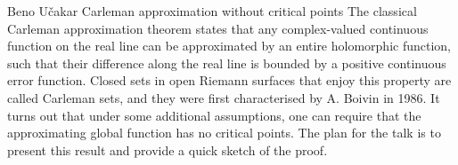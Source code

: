 \talk
{%
    Beno Učakar
}
{%
    Carleman approximation without critical points
}
{%
    The classical Carleman approximation theorem states that any
    complex-valued continuous function on the real line can be
    approximated by an entire holomorphic function, such that their
    difference along the real line is bounded by a positive
    continuous error function. Closed sets in open Riemann surfaces
    that enjoy this property are called Carleman sets, and they were
    first characterised by A. Boivin in 1986. It turns out that
    under some additional assumptions, one can require that the
    approximating global function has no critical points. The plan
    for the talk is to present this result and provide a quick
    sketch of the proof.
}
